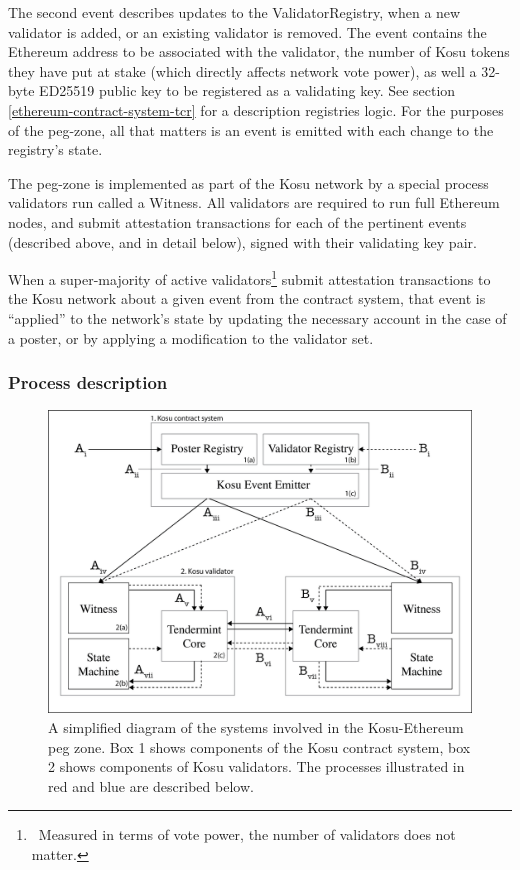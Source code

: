 \documentclass[10pt]{article}
\begin{document}
The second event describes updates to the ValidatorRegistry, when a new validator is added, or an existing validator is removed. The event contains the Ethereum address to be associated with the validator, the number of Kosu tokens they have put at stake (which directly affects network vote power), as well a 32-byte ED25519 public key to be registered as a validating key\cite{tendermint-crypto-spec}. See section \ref{ethereum-contract-system-tcr} for a description registries logic. For the purposes of the peg-zone, all that matters is an event is emitted with each change to the registry’s state.
\medskip

The peg-zone is implemented as part of the Kosu network by a special process validators run called a Witness. All validators are required to run full Ethereum nodes, and submit attestation transactions for each of the pertinent events (described above, and in detail below), signed with their validating key pair. 
\medskip

When a super-majority of active validators\footnote{\ Measured in terms of vote power, the number of validators does not matter.} submit attestation transactions to the Kosu network about a given event from the contract system, that event is ``applied'' to the network’s state by updating the necessary account in the case of a poster, or by applying a modification to the validator set.
\subsubsection{Process description}\label{peg-process}
\begin{figure}[H]
  \centering
  \includegraphics[width=\textwidth]{../figures/fig1.png}
  \caption{A simplified diagram of the systems involved in the Kosu-Ethereum peg zone. Box 1 shows components of the Kosu contract system, box 2 shows components of Kosu validators. The processes illustrated in red and blue are described below.}
  \label{fig:fig2}
\end{figure}
\end{document}
